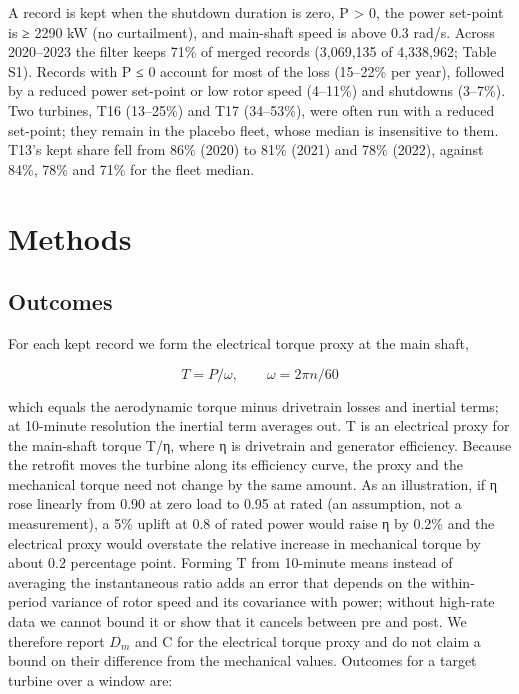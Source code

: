 \documentclass[preprint,12pt]{elsarticle}
\begin{document}
A record is kept when the shutdown duration is zero, P \textgreater{} 0, the power set-point is ≥ 2290 kW (no curtailment), and main-shaft speed is above 0.3 rad/s. Across 2020--2023 the filter keeps 71\% of merged records (3,069,135 of 4,338,962; Table S1). Records with P ≤ 0 account for most of the loss (15--22\% per year), followed by a reduced power set-point or low rotor speed (4--11\%) and shutdowns (3--7\%). Two turbines, T16 (13--25\%) and T17 (34--53\%), were often run with a reduced set-point; they remain in the placebo fleet, whose median is insensitive to them. T13's kept share fell from 86\% (2020) to 81\% (2021) and 78\% (2022), against 84\%, 78\% and 71\% for the fleet median.

\section{Methods}

\subsection{Outcomes}

For each kept record we form the electrical torque proxy at the main shaft,

\begin{equation}
T = P/\omega , \qquad \omega = 2\pi n/60
\label{eq:T}
\end{equation}

which equals the aerodynamic torque minus drivetrain losses and inertial terms; at 10-minute resolution the inertial term averages out. T is an electrical proxy for the main-shaft torque T/η, where η is drivetrain and generator efficiency. Because the retrofit moves the turbine along its efficiency curve, the proxy and the mechanical torque need not change by the same amount. As an illustration, if η rose linearly from 0.90 at zero load to 0.95 at rated (an assumption, not a measurement), a 5\% uplift at 0.8 of rated power would raise η by 0.2\% and the electrical proxy would overstate the relative increase in mechanical torque by about 0.2 percentage point. Forming T from 10-minute means instead of averaging the instantaneous ratio adds an error that depends on the within-period variance of rotor speed and its covariance with power; without high-rate data we cannot bound it or show that it cancels between pre and post. We therefore report \(D_{m}\) and C for the electrical torque proxy and do not claim a bound on their difference from the mechanical values. Outcomes for a target turbine over a window are:
\end{document}
